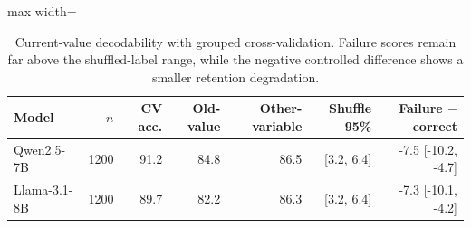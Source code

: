 \begin{table}[htbp]
\centering
\footnotesize
\setlength{\tabcolsep}{4.5pt}
\caption{Current-value decodability with grouped cross-validation. Failure scores remain far above the shuffled-label range, while the negative controlled difference shows a smaller retention degradation.}
\label{tab:mechanism}
\begin{adjustbox}{max width=\textwidth}
\begin{tabular}{lrrrrrr}
\toprule
Model & $n$ & CV acc. & Old-value & Other-variable & Shuffle 95\% & Failure $-$ correct \\
\midrule
Qwen2.5-7B & 1200 & 91.2 & 84.8 & 86.5 & [3.2, 6.4] & -7.5 [-10.2, -4.7] \\
Llama-3.1-8B & 1200 & 89.7 & 82.2 & 86.3 & [3.2, 6.4] & -7.3 [-10.1, -4.2] \\
\bottomrule
\end{tabular}
\end{adjustbox}
\end{table}
